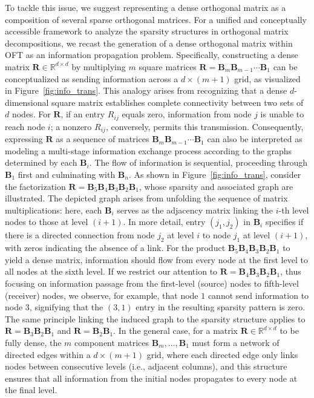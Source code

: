 To tackle this issue, we suggest representing a dense orthogonal matrix as a composition of several sparse orthogonal matrices. For a unified and conceptually accessible framework to analyze the sparsity structures in orthogonal matrix decompositions, we recast the generation of a dense orthogonal matrix within OFT as an information propagation problem. Specifically, constructing a dense matrix $\bm{R}\in\mathbb{R}^{d\times d}$ by multiplying $m$ square matrices $\bm{R}=\bm{B}_m\bm{B}_{m-1}\cdots\bm{B}_1$ can be conceptualized as sending information across a $d\times (m+1)$ grid, as visualized in Figure~\ref{fig:info_trans}. This analogy arises from recognizing that a dense $d$-dimensional square matrix establishes complete connectivity between two sets of $d$ nodes. For $\bm{R}$, if an entry $R_{ij}$ equals zero, information from node $j$ is unable to reach node $i$; a nonzero $R_{ij}$, conversely, permits this transmission. Consequently, expressing $\bm{R}$ as a sequence of matrices $\bm{B}_m\bm{B}_{m-1}\cdots\bm{B}_1$ can also be interpreted as modeling a multi-stage information exchange process according to the graphs determined by each $\bm{B}_i$. The flow of information is sequential, proceeding through $\bm{B}_1$ first and culminating with $\bm{B}_n$. As shown in Figure~\ref{fig:info_trans}, consider the factorization $\bm{R}=\bm{B}_5\bm{B}_4\bm{B}_3\bm{B}_2\bm{B}_1$, whose sparsity and associated graph are illustrated. The depicted graph arises from unfolding the sequence of matrix multiplications: here, each $\bm{B}_i$ serves as the adjacency matrix linking the $i$-th level nodes to those at level $(i+1)$. In more detail, entry $(j_1,j_2)$ in $\bm{B}_i$ specifies if there is a directed connection from node $j_2$ at level $i$ to node $j_1$ at level $(i+1)$, with zeros indicating the absence of a link. For the product $\bm{B}_5\bm{B}_4\bm{B}_3\bm{B}_2\bm{B}_1$ to yield a dense matrix, information should flow from every node at the first level to all nodes at the sixth level. If we restrict our attention to $\bm{R}=\bm{B}_4\bm{B}_3\bm{B}_2\bm{B}_1$, thus focusing on information passage from the first-level (source) nodes to fifth-level (receiver) nodes, we observe, for example, that node $1$ cannot send information to node $3$, signifying that the $(3,1)$ entry in the resulting sparsity pattern is zero. The same principle linking the induced graph to the sparsity structure applies to $\bm{R}=\bm{B}_3\bm{B}_2\bm{B}_1$ and $\bm{R}=\bm{B}_2\bm{B}_1$. In the general case, for a matrix $\bm{R}\in\mathbb{R}^{d\times d}$ to be fully dense, the $m$ component matrices $\bm{B}_m,\ldots,\bm{B}_1$ must form a network of directed edges within a $d\times (m+1)$ grid, where each directed edge only links nodes between consecutive levels (i.e., adjacent columns), and this structure ensures that all information from the initial nodes propagates to every node at the final level.

